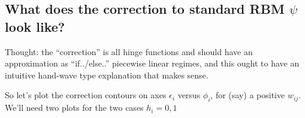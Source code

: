 \documentclass{article}
\begin{document}
    \subsection{\texorpdfstring{What does the correction to standard RBM
\(\psi\) look
like?}{What does the correction to standard RBM \textbackslash{}psi look like?}}\label{what-does-the-correction-to-standard-rbm-psi-look-like}

Thought: the ``correction'' is all hinge functions and should have an
approximation as ``if../else..'' piecewise linear regimes, and this
ought to have an intuitive hand-wave type explanation that makes sense.

So let's plot the correction contours on axes \(\epsilon_i\) versus
\(\phi_i\), for (say) a positive \(w_{ij}\). We'll need two plots for
the two cases \(h_i=0,1\)
\end{document}
